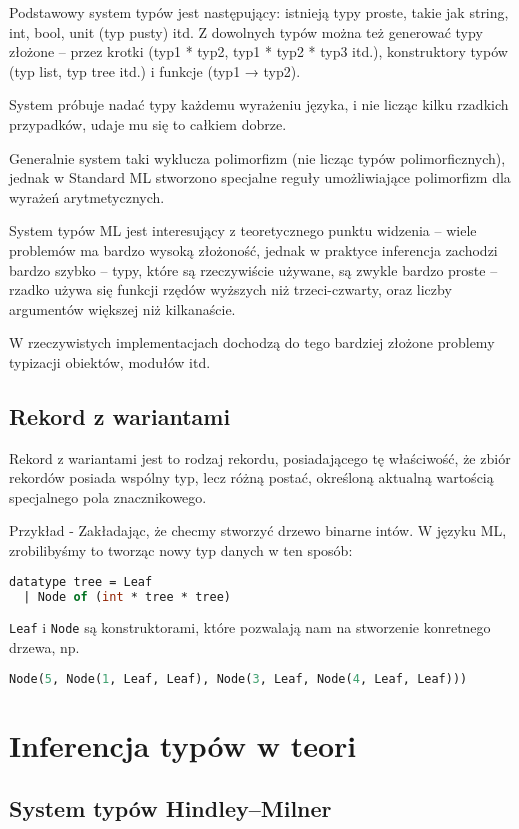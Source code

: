 \documentclass{article}
\begin{document}
Podstawowy system typów jest następujący: istnieją typy proste, takie jak string, int, bool, unit (typ pusty) itd. Z dowolnych typów można też generować typy złożone – przez krotki (typ1 * typ2, typ1 * typ2 * typ3 itd.), konstruktory typów (typ list, typ tree itd.) i funkcje (typ1 → typ2).

System próbuje nadać typy każdemu wyrażeniu języka, i nie licząc kilku rzadkich przypadków, udaje mu się to całkiem dobrze.

Generalnie system taki wyklucza polimorfizm (nie licząc typów polimorficznych), jednak w Standard ML stworzono specjalne reguły umożliwiające polimorfizm dla wyrażeń arytmetycznych.

System typów ML jest interesujący z teoretycznego punktu widzenia – wiele problemów ma bardzo wysoką złożoność, jednak w praktyce inferencja zachodzi bardzo szybko – typy, które są rzeczywiście używane, są zwykle bardzo proste – rzadko używa się funkcji rzędów wyższych niż trzeci-czwarty, oraz liczby argumentów większej niż kilkanaście.

W rzeczywistych implementacjach dochodzą do tego bardziej złożone problemy typizacji obiektów, modułów itd.

\subsection{Rekord z wariantami} Rekord z wariantami jest to rodzaj rekordu, posiadającego tę właściwość, że zbiór rekordów posiada wspólny typ, lecz różną postać, określoną aktualną wartością specjalnego pola znacznikowego.

Przykład - Zakładając, że checmy stworzyć drzewo binarne intów. W języku ML, zrobilibyśmy to tworząc nowy typ danych w ten sposób:
\begin{lstlisting}[language=ML]
datatype tree = Leaf
  | Node of (int * tree * tree)
\end{lstlisting}
\lstinline{Leaf} i \lstinline{Node} są konstruktorami, które pozwalają nam na stworzenie konretnego drzewa, np.
\begin{lstlisting}[language=ML]
  Node(5, Node(1, Leaf, Leaf), Node(3, Leaf, Node(4, Leaf, Leaf)))
\end{lstlisting}
\section{Inferencja typów w teori}
\subsection{System typów Hindley–Milner}
\end{document}
